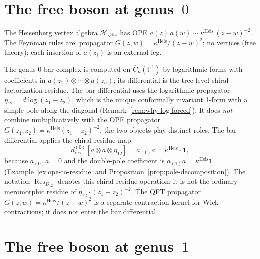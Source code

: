 \section{The free boson at genus~\texorpdfstring{$0$}{0}}

The Heisenberg vertex algebra $\mathcal{H}_{\kappa^{\mathrm{Heis}}}$ has OPE
$a(z)\,a(w) \sim \kappa^{\mathrm{Heis}}\,(z-w)^{-2}$. The Feynman rules are:
propagator $G(z,w) = \kappa^{\mathrm{Heis}}/(z-w)^2$; no vertices (free theory);
each insertion of $a(z_i)$ is an external leg.

\begin{center}
\end{center}

The genus-$0$ bar complex is computed on
$\overline{C}_n(\mathbb{P}^1)$ by logarithmic forms with coefficients
in $a(z_1)\otimes\cdots\otimes a(z_n)$; its differential is the
tree-level chiral factorization residue.
The bar differential uses the logarithmic propagator
$\eta_{12} = d\log(z_1 - z_2)$, which is the unique conformally invariant
1-form with a simple pole along the diagonal (Remark~\ref{rem:why-log-forced}).
It does \emph{not} combine multiplicatively with the OPE propagator
$G(z_1,z_2)=\kappa^{\mathrm{Heis}}(z_1-z_2)^{-2}$; the two objects play distinct roles.
The bar differential applies the chiral residue map:
\begin{equation}\label{eq:heisenberg-bar-residue}
d^{(0)}_{\mathrm{res}}[a \otimes a \otimes \eta_{12}]
= a_{(1)}a
= \kappa^{\mathrm{Heis}} \cdot \mathbf{1},
\end{equation}
because $a_{(0)}a=0$ and the double-pole coefficient is
$a_{(1)}a=\kappa^{\mathrm{Heis}}\mathbf{1}$
(Example~\ref{ex:ope-to-residue} and Proposition~\ref{prop:pole-decomposition}).
The notation $\operatorname{Res}_{D_{12}}$ denotes this chiral residue
operation; it is not the ordinary meromorphic residue of
$\eta_{12}\cdot (z_1-z_2)^{-2}$.
The QFT propagator $G(z,w)=\kappa^{\mathrm{Heis}}/(z-w)^2$ is a separate contraction kernel
for Wick contractions; it does not enter the bar differential.

\section{The free boson at genus~\texorpdfstring{$1$}{1}}

